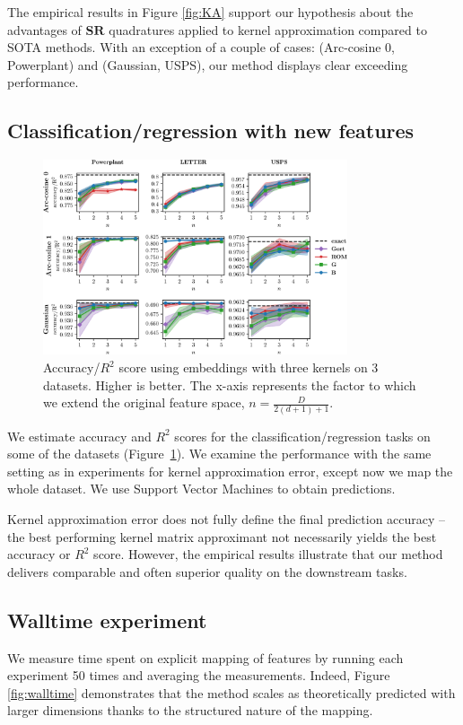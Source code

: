 The empirical results in Figure \ref{fig:KA} support our hypothesis about the advantages of $\mathbf{SR}$ quadratures applied to kernel approximation compared to SOTA methods.
With an exception of a couple of cases: (Arc-cosine 0, Powerplant) and (Gaussian, USPS), our method displays clear exceeding performance.

\subsection{Classification/regression with new features}
\label{sub:finalscore}
\begin{figure}[h]
\centering
\includegraphics[width=0.8\textwidth]{figures/quadratures/Powerplant_LETTER_USPSacc_plain}
\caption{Accuracy/$R^2$ score using embeddings with three kernels on 3 datasets. Higher is better.
The x-axis represents the factor to which we extend the original feature space, $n = \frac{D}{2(d+1)+1}$.}
\label{fig:acc}
\end{figure}

We estimate accuracy and $R^2$ scores for the classification/regression tasks on some of the datasets (Figure~\ref{fig:acc}).
We examine the performance with the same setting as in experiments for kernel approximation error, except now we map the whole dataset.
We use Support Vector Machines to obtain predictions.

Kernel approximation error does not fully define the final prediction accuracy -- the best performing kernel matrix approximant not necessarily yields the best accuracy or $R^2$ score. However, the empirical results illustrate that our method delivers comparable and often superior quality on the downstream tasks.

\subsection{Walltime experiment}
We measure time spent on explicit mapping of features by running each experiment 50 times and averaging the measurements.  Indeed, Figure \ref{fig:walltime} demonstrates that the method scales as theoretically predicted with larger dimensions thanks to the structured nature of the mapping.

